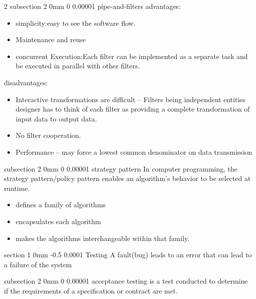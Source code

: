 \documentclass[a4paper,11pt]{article}
\makeatletter
\renewcommand{\section}{\@startsection
   {section}%
   {1}%
   {0mm}%
   {-0.5\baselineskip}%
   {0.0001\baselineskip}%
   {\sffamily\bfseries\upshape\normalsize}}%
\renewcommand{\subsection}{\@startsection
   {subsection}%
   {2}%
   {0mm}%
   {0\baselineskip}%
   {0.00001\baselineskip}%
   {\rmfamily\normalfont\slshape\normalsize}}%
\makeatother
\begin{document}
\begin{multicols}{2}
 \subsection{pipe-and-filters}
 advantages:
 \vspace{0 mm}
 \begin{itemize}
  \setlength\itemsep{0em}
 \item simplicity:easy to see the software flow.
 \item Maintenance and reuse
 \item concurrent Execution:Each filter can be implemented as a separate task and be executed in parallel with other filters.
 \end{itemize}
 disadvantages:
 \vspace{0 mm}
 \begin{itemize}
  \setlength\itemsep{0em}
\item Interactive transformations are difficult – Filters being independent entities designer has to think of each filter as providing a complete transformation of input data to output data.
\item No filter cooperation.
\item Performance – may force a lowest common denominator on data transmission
\end{itemize}

 \subsection{strategy pattern}
 In computer programming, the strategy pattern/policy pattern enables an algorithm's behavior to be selected at runtime.
 \vspace{0 mm}
\begin{itemize}
 \setlength\itemsep{0em}
\item defines a family of algorithms
\item encapsulates each algorithm
\item makes the algorithms interchangeable within that family.
\end{itemize}

\section{Testing}
A fault(bug) leads to an error that can lead to a failure of the system

\subsection{acceptance testing}
 is a test conducted to determine if the requirements of a specification or contract are met.
 

\end{multicols}
\end{document}

